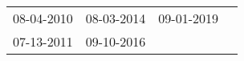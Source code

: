 \begin{supertabular}{llll}
 08-04-2010 &  08-03-2014 &  09-01-2019 \\
 07-13-2011 &  09-10-2016 &             \\
\end{supertabular}
